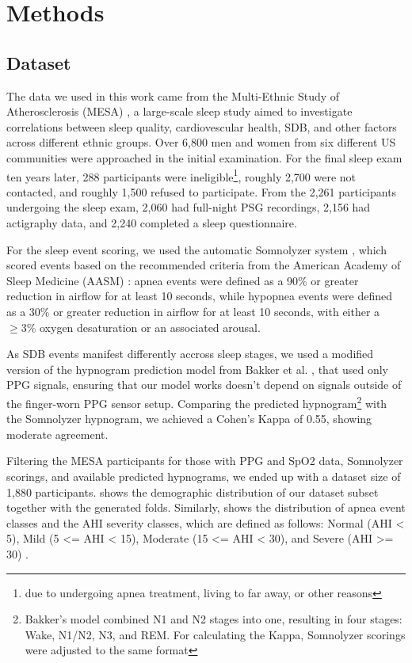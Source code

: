 \chapter{Methods \label{Chapter-Methods}}

\section{Dataset}

The data we used in this work came from the Multi-Ethnic Study of Atherosclerosis (MESA) \cite{chen2015racial}, a large-scale sleep study aimed to investigate correlations between sleep quality, cardiovescular health, SDB, and other factors across different ethnic groups.
Over 6,800 men and women from six different US communities were approached in the initial examination. For the final sleep exam ten years later, 288 participants were ineligible\footnote{due to undergoing apnea treatment, living to far away, or other reasons}, roughly 2,700 were not contacted, and roughly 1,500 refused to participate. From the 2,261 participants undergoing the sleep exam, 2,060 had full-night PSG recordings, 2,156 had actigraphy data, and 2,240 completed a sleep questionnaire.

For the sleep event scoring, we used the automatic Somnolyzer system , which scored events based on the recommended criteria from the American Academy of Sleep Medicine (AASM) : apnea events were defined as a 90\% or greater reduction in airflow for at least 10 seconds, while hypopnea events were defined as a 30\% or greater reduction in airflow for at least 10 seconds, with either a $\geq 3\%$ oxygen desaturation or an associated arousal. 

As SDB events manifest differently accross sleep stages, we used a modified version of the hypnogram prediction model from Bakker et al. \cite{bakker2021estimating}, that used only PPG signals, ensuring that our model works doesn't depend on signals outside of the finger-worn PPG sensor setup. Comparing the predicted hypnogram\footnote{Bakker's model combined N1 and N2 stages into one, resulting in four stages: Wake, N1/N2, N3, and REM. For calculating the Kappa, Somnolyzer scorings were adjusted to the same format} with the Somnolyzer hypnogram, we achieved a Cohen's Kappa of 0.55, showing moderate agreement.

Filtering the MESA participants for those with PPG and SpO2 data, Somnolyzer scorings, and available predicted hypnograms, we ended up with a dataset size of 1,880 participants.  shows the demographic distribution of our dataset subset together with the generated folds. Similarly,  shows the distribution of apnea event classes and the AHI severity classes, which are defined as follows: Normal (AHI < 5), Mild (5 <= AHI < 15), Moderate (15 <= AHI < 30), and Severe (AHI >= 30) .


